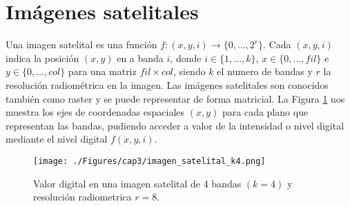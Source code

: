 \section{Im\'agenes satelitales}

Una imagen satelital es una funci\'on $ f:(x,y,i) \longrightarrow \{0,...,2^{r}\} $. Cada $ (x,y,i) $ indica la posición $ (x,y) $ en a banda $ i $, donde $ i \in \{1,...,k\} $, $ x \in \{0,...,fil\} $ e $ y \in \{0,...,col\} $ para una matriz $ fil \times col $, siendo $ k $ el numero de bandas y $ r $ la resoluci\'on radiom\'etrica en la imagen. Las im\'agenes satelitales son conocidos tambi\'en como raster \cite{vasquez2011mineria} y se puede representar de forma matricial. La Figura \ref{fig:imagenMultiespectral} nos muestra los ejes de coordenadas espaciales $ (x,y) $ para cada plano que representan las bandas, pudiendo acceder a valor de la intensidad o nivel digital mediante el nivel digital  $ f(x,y,i) $.
  \begin{figure}[H]
  	\centering
  	\texttt{[image: ./Figures/cap3/imagen\_satelital\_k4.png]}
  	\caption{Valor digital en una imagen satelital de 4 bandas $ (k=4) $ y resoluci\'on radiometrica $ r=8 $.}
  	\label{fig:imagenMultiespectral}
  \end{figure}



